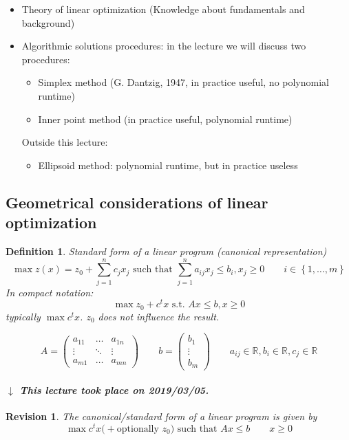 \documentclass[a4paper]{article}
\numberwithin{lecref}{subsection}
\newtheorem*{Definition}{Definition}
\newtheorem*{Revision}{Revision}
\newcommand{\Set}[1]{\left\{#1\right\}}
\newcommand{\dateref}[1]{%
  \begin{mdframed}[backgroundcolor=gray!10,innerbottommargin=0pt,innertopmargin=0pt]
    \paragraph{\textit{$\downarrow$ This lecture took place on #1.}}%
  \end{mdframed}%
}
\begin{document}
\begin{itemize}
	\item Theory of linear optimization (Knowledge about fundamentals and background)
	\item Algorithmic solutions procedures: in the lecture we will discuss two procedures:
		\begin{itemize}
			\item Simplex method (G. Dantzig, 1947, in practice useful, no polynomial runtime)
			\item Inner point method (in practice useful, polynomial runtime)
		\end{itemize}
		Outside this lecture:
		\begin{itemize}
			\item Ellipsoid method: polynomial runtime, but in practice useless
		\end{itemize}
\end{itemize}

\subsection{Geometrical considerations of linear optimization}

\begin{Definition}
  Standard form of a linear program (canonical representation)
  \[ \max{z(x)} = z_0 + \sum_{j=1}^n c_j x_j \text{ such that } \sum_{j=1}^n a_{ij} x_j \leq b_i, x_j \geq 0 \qquad i \in \Set{1, \dots, m} \]
  In compact notation:
  \[ \max{z_0 + c^t x} \text{ s.t. } Ax \leq b, x \geq 0 \]
  typically $\max c^t x$.
  $z_0$ does not influence the result.

  \[ A = \begin{pmatrix} a_{11} & \dots & a_{1n} \\ \vdots & \ddots & \vdots \\ a_{m1} & \dots & a_{mn} \end{pmatrix} \qquad b = \begin{pmatrix} b_1 \\ \vdots \\ b_m \end{pmatrix} \qquad a_{ij} \in \mathbb R, b_i \in \mathbb R, c_j \in \mathbb R \]
\end{Definition}

\dateref{2019/03/05}

\begin{Revision}
	The canonical/standard form of a linear program is given by
	\[ \max c^t x \text{(} + \text{optionally } z_0 \text{) such that } Ax \leq b \qquad x \geq 0 \]
\end{Revision}
\end{document}
